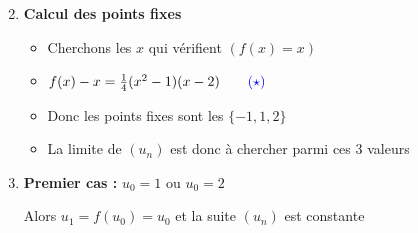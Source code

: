 \begin{frame}
\end{frame}



\begin{frame}
\begin{exemple}
\begin{enumerate}
  \setcounter{enumi}{1}
  \item \textbf{Calcul des points fixes}
  \begin{itemize}
\pause
    \item Cherchons les $x$ qui vérifient $(f(x)=x)$
\pause    
    \item $f(x)-x=\frac14 (x^2-1)(x-2) \qquad \color{blue}{(\star)}$
\pause    
    \item Donc les points fixes sont les $\{-1,1,2\}$
\pause    
    \item La limite de $(u_n)$ est donc à chercher parmi ces $3$ valeurs
  \end{itemize}

\bigskip
\pause
   \item \textbf{Premier cas :} $u_0=1$ ou $u_0=2$
\pause  

  Alors $u_1=f(u_0)=u_0$ et la suite $(u_n)$ est constante
\end{enumerate}


\end{exemple}
\end{frame}




